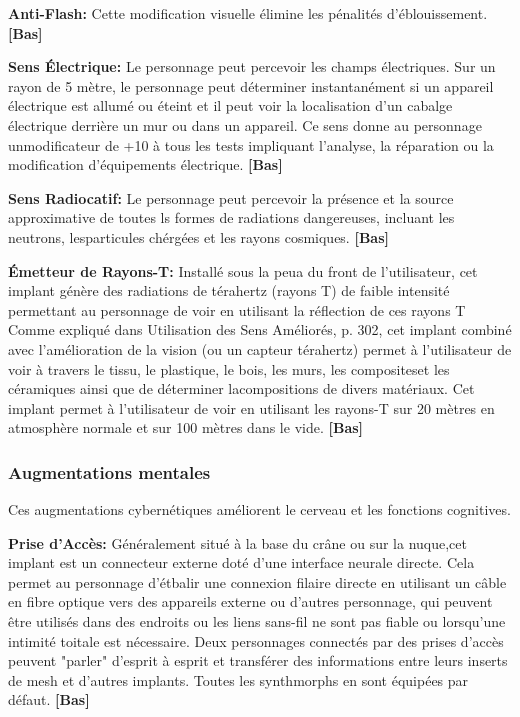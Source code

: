 \textbf{Anti-Flash:} Cette modification visuelle élimine les pénalités d'éblouissement. \textbf{[Bas]} 

\textbf{Sens Électrique:} Le personnage peut percevoir les champs électriques. Sur un rayon de 5 mètre, le personnage peut déterminer instantanément si un appareil électrique est allumé ou éteint et il peut voir la localisation d'un cabalge électrique derrière un mur ou dans un appareil. Ce sens donne au personnage unmodificateur de +10 à tous les tests impliquant l'analyse, la réparation ou la modification d'équipements électrique. \textbf{[Bas]} 

\textbf{Sens Radiocatif:} Le personnage peut percevoir la présence et la source approximative de toutes ls formes de radiations dangereuses, incluant les neutrons, lesparticules chérgées et les rayons cosmiques. \textbf{[Bas]} 

\textbf{Émetteur de Rayons-T:} Installé sous la peua du front de l'utilisateur, cet implant génère des radiations de térahertz (rayons T) de faible intensité permettant au personnage de voir en utilisant la réflection de ces rayons T Comme expliqué dans Utilisation des Sens Améliorés, p. 302, cet implant combiné avec l'amélioration de la vision (ou un capteur térahertz) permet à l'utilisateur de voir à travers le tissu, le plastique, le bois, les murs, les compositeset les céramiques ainsi que de déterminer lacompositions de divers matériaux. Cet implant permet à l'utilisateur de voir en utilisant les rayons-T sur 20 mètres en atmosphère normale et sur 100 mètres dans le vide. \textbf{[Bas]} 

\subsubsection{Augmentations mentales} 

Ces augmentations cybernétiques améliorent le cerveau et les fonctions cognitives. 

\textbf{Prise d'Accès:} Généralement situé à la base du crâne ou sur la nuque,cet implant est un connecteur externe doté d'une interface neurale directe. Cela permet au personnage d'étbalir une connexion filaire directe en utilisant un câble en fibre optique vers des appareils externe ou d'autres personnage, qui peuvent être utilisés dans des endroits ou les liens sans-fil ne sont pas fiable ou lorsqu'une intimité toitale est nécessaire. Deux personnages connectés par des prises d'accès peuvent "parler" d'esprit à esprit et transférer des informations entre leurs inserts de mesh et d'autres implants. Toutes les synthmorphs en sont équipées par défaut. \textbf{[Bas]} 

